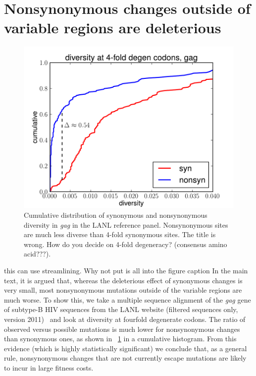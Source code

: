 \documentclass[rmp]{revtex4}
\newcommand{\comment}[1]{{\color{red}#1}}
\begin{document}
\section{Nonsynonymous changes outside of variable regions are deleterious}
\begin{figure}[h]
\begin{center}
\includegraphics[width=0.5\linewidth]{synmut_conservation_4fold_synnonsyn}
\caption{Cumulative distribution of synonymous and nonsynonymous diversity in
{\it gag} in the LANL reference panel. Nonsynonymous sites are much
less diverse than 4-fold synonymous sites. \comment{The title is wrong. How
do you decide on 4-fold degeneracy? (consensus amino acid???)}.}
\label{fig:synnonsyncons}
\end{center}
\end{figure}
\comment{this can use streamlining. Why not put is all into the figure caption}
In the main text, it is argued that, whereas the deleterious effect of
synonymous changes is very small, most nonsynonymous mutations outside of the
variable regions are much worse. To show this, we take a multiple sequence alignment of
the {\it gag} gene of subtype-B HIV sequences from the LANL website (filtered
sequences only, version 2011)~\cite{LANL2012} and look at diversity at fourfold degenerate
codons. The ratio of observed versus possible mutations is much lower for
nonsynonymous changes than synonymous ones, as shown in
\figurename~\ref{fig:synnonsyncons} in a cumulative histogram. From this
evidence (which is highly statistically significant) we conclude that, as a
general rule, nonsynonymous changes that are not currently escape mutations
are likely to incur in large fitness costs.

\end{document}
